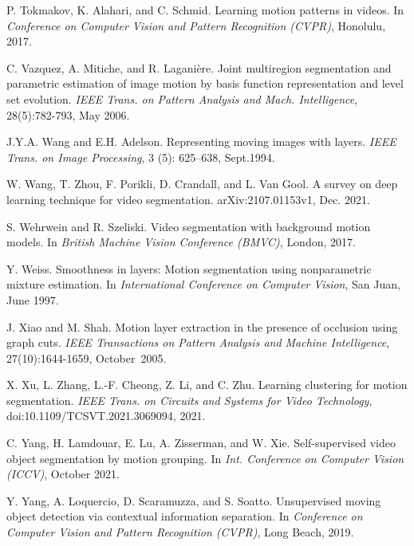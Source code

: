 \documentclass[10pt,twocolumn,letterpaper]{article}
\begin{document}
\begin{thebibliography}{28}
P. Tokmakov, K. Alahari, and C. Schmid.
\newblock Learning motion patterns in videos.
\newblock In \emph{Conference on Computer Vision and Pattern Recognition (CVPR)}, Honolulu, 2017.



C. Vazquez, A. Mitiche, and R. Laganière.
\newblock Joint multiregion segmentation and parametric estimation of image motion by basis function representation and level set evolution.
\newblock \emph{IEEE Trans. on Pattern Analysis and Mach. Intelligence}, 28(5):782-793, May 2006.

J.Y.A. Wang and E.H. Adelson.
\newblock Representing moving images with layers.
\newblock \emph{IEEE Trans. on Image Processing}, 3 (5): 625--638, Sept.1994.


W. Wang, T. Zhou, F. Porikli, D. Crandall, and L. Van Gool.
\newblock A survey on deep learning technique for video segmentation.
\newblock arXiv:2107.01153v1, Dec. 2021.






S. Wehrwein and R. Szeliski.
\newblock Video segmentation with background motion models.
\newblock In \emph{British Machine Vision Conference (BMVC)}, {London}, 2017.


Y. Weiss.
\newblock Smoothness in layers: Motion segmentation using nonparametric mixture estimation.
\newblock In \emph{International Conference on Computer Vision}, San Juan, June 1997.
 
J. Xiao and M. Shah.
\newblock Motion layer extraction in the presence of occlusion using graph cuts.
\newblock \emph{IEEE Transactions on Pattern Analysis and Machine Intelligence}, 27(10):1644-1659, October~2005.

X. Xu, L. Zhang, L.-F. Cheong, Z. Li, and C. Zhu.
\newblock Learning clustering for motion segmentation.
\newblock \emph{IEEE Trans. on Circuits and Systems for Video Technology}, doi:10.1109/TCSVT.2021.3069094, 2021.

C. Yang, H. Lamdouar, E. Lu, A. Zisserman, and W. Xie.
\newblock Self-supervised video object segmentation by motion grouping.
\newblock In \emph{Int. Conference on Computer Vision (ICCV)}, October 2021.

Y. Yang, A. Loquercio, D. Scaramuzza, and S. Soatto.
\newblock Unsupervised moving object detection via contextual information separation.
\newblock In \emph{Conference on Computer Vision and Pattern Recognition (CVPR)}, Long Beach, 2019.
  

\end{thebibliography}
\end{document}
